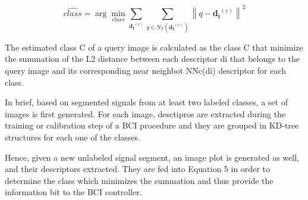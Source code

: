 \begin{equation}
\hat{class} = \arg \min_{class} \sum_{\mathbf{d_i}^{(c)}} \sum_{q \in N_T(\mathbf{d_i}^{(c)})}^{} {\left\lVert q -  \mathbf{d_i}^{(c)} \right\rVert}  ^{2}
\label{eq:multiclassificationrow}
\end{equation}

The estimated class C of a query image is calculated as the class C that minimize the summation of the L2 distance between each descriptor di that belongs to the query image and its corresponding near neighbot NNc(di) descriptor for each class.

In brief, based on segmented signals from at least two labeled classes, a set of images is first generated.  For each image, desctipros are extracted during the training or calibration step of a BCI procedure and they are grouped in KD-tree~\cite{Lowe2004} structures for each one of the classes.

Hence, given a new unlabeled signal segment, an image plot is generated as well, and their descriptors extracted.  They are fed into Equation 5 in order to determine the class which minimizes the summation and thus provide the information bit to the BCI controller.  


